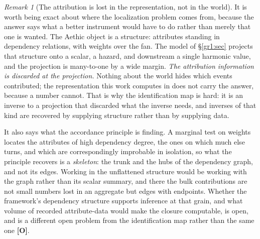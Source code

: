 \documentclass[11pt]{article}
\numberwithin{equation}{section}
\theoremstyle{plain}
\theoremstyle{definition}
\theoremstyle{remark}
\newtheorem{remark}[theorem]{Remark}
\begin{document}
\begin{remark}[The attribution is lost in the representation, not in the
world]\label{gc:rem:flattening}
It is worth being exact about where the localization problem comes from,
because the answer says what a better instrument would have to do rather
than merely that one is wanted. The Aethic object is a structure: attributes standing in dependency
relations, with weights over the fan. The model of \S\ref{gr1:sec}
projects that structure onto a scalar, a hazard, and downstream a
single harmonic value, and the projection is many-to-one by a wide
margin. \emph{The attribution information is discarded at the
projection.} Nothing about the world hides which events contributed;
the representation this work computes in does not carry the answer,
because a number cannot. That is why the identification map is hard: it
is an inverse to a projection that discarded what the inverse needs, and
inverses of that kind are recovered by supplying structure rather than by
supplying data.

It also says what the accordance principle is finding. A marginal test on
weights locates the attributes of high dependency degree, the ones on
which much else turns, and which are correspondingly improbable in
isolation, so what the principle recovers is a \emph{skeleton}: the
trunk and the hubs of the dependency graph, and not its edges. Working in
the unflattened structure would be working with the graph rather than its
scalar summary, and there the bulk contributions are not small numbers
lost in an aggregate but edges with endpoints. Whether the framework's
dependency structure supports inference at that grain, and what
volume of recorded attribute-data would make the closure computable, is
open, and is a different open problem from the identification map rather
than the same one \textbf{[O]}.
\end{remark}
\end{document}
